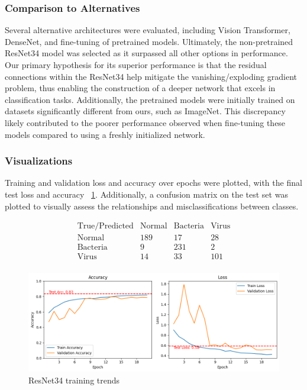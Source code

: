 \documentclass{article}
\begin{document}
\subsubsection{Comparison to Alternatives}
Several alternative architectures were evaluated, including Vision Transformer, DenseNet, and fine-tuning of pretrained models. Ultimately, the non-pretrained ResNet34 model was selected as it surpassed all other options in performance. Our primary hypothesis for its superior performance is that the residual connections within the ResNet34 help mitigate the vanishing/exploding gradient problem, thus enabling the construction of a deeper network that excels in classification tasks. Additionally, the pretrained models were initially trained on datasets significantly different from ours, such as ImageNet. This discrepancy likely contributed to the poorer performance observed when fine-tuning these models compared to using a freshly initialized network.

\subsubsection{Visualizations}
Training and validation loss and accuracy over epochs were plotted, with the final test loss and accuracy ~\ref{fig:resnet_training_trends}.
Additionally, a confusion matrix on the test set was plotted to visually assess the relationships and misclassifications between classes.

\[
\begin{array}{c|cccc}
\text{True/Predicted} & \text{Normal} & \text{Bacteria} & \text{Virus} \\
\hline
\text{Normal} & 189 & 17 & 28 \\
\text{Bacteria} & 9 & 231 & 2 \\
\text{Virus} & 14 & 33 & 101 \\
\end{array}
\]


\begin{figure}
  \centering
  \includegraphics[width=0.8\linewidth, angle=0]{resnet_training_trends.png}
  \caption{ResNet34 training trends}
  \label{fig:resnet_training_trends}
\end{figure}
\end{document}
